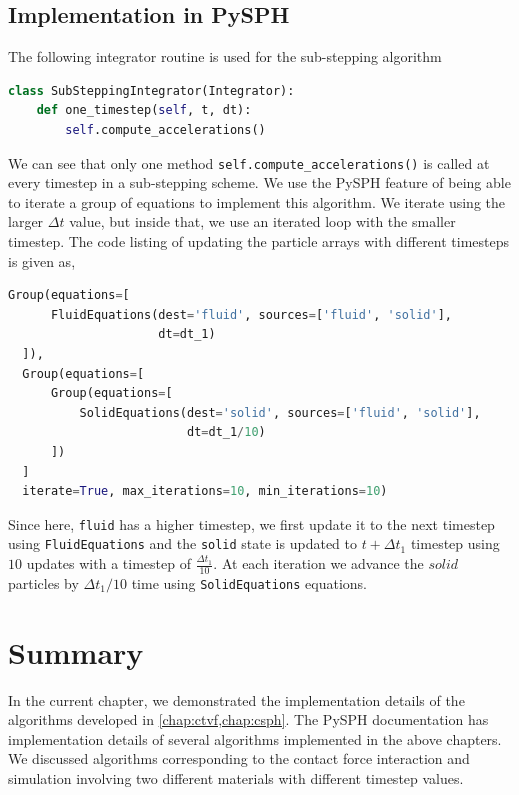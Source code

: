\subsection{Implementation in PySPH}
\label{sec:pysph-substepping-algorithm}
The following integrator routine is used for the sub-stepping algorithm
\lstset{basicstyle=\footnotesize\ttfamily}
\begin{lstlisting}[label={contact:equations},frame=lines,language=Python,upquote=True]
class SubSteppingIntegrator(Integrator):
    def one_timestep(self, t, dt):
        self.compute_accelerations()
\end{lstlisting}
We can see that only one method \texttt{self.compute\_accelerations()} is
called at every timestep in a sub-stepping scheme. We use the PySPH feature of
being able to iterate a group of equations to implement this algorithm. We
iterate using the larger $\Delta t$ value, but inside that, we use an iterated
loop with the smaller timestep. The code listing of updating the particle
arrays with different timesteps is given as,
\lstset{basicstyle=\footnotesize\ttfamily}
\begin{lstlisting}[label={contact:equations},frame=lines,language=Python,upquote=True]
  Group(equations=[
      FluidEquations(dest='fluid', sources=['fluid', 'solid'],
                     dt=dt_1)
  ]),
  Group(equations=[
      Group(equations=[
          SolidEquations(dest='solid', sources=['fluid', 'solid'],
                         dt=dt_1/10)
      ])
  ]
  iterate=True, max_iterations=10, min_iterations=10)
\end{lstlisting}
Since here, \texttt{fluid} has a higher timestep, we first update it to the next
timestep using \texttt{FluidEquations} and the \texttt{solid} state is updated
to $t + \Delta t_1$ timestep using $10$ updates with a timestep of
$\frac{\Delta t_1}{10}$. At each iteration we advance the $solid$ particles by
$\Delta t_1 / 10$ time using \texttt{SolidEquations} equations.


\FloatBarrier%
\section{Summary}
\label{sec:id:summary}
In the current chapter, we demonstrated the implementation details of the
algorithms developed in \cref{chap:ctvf,chap:csph}. The PySPH documentation has
implementation details of several algorithms implemented in the above chapters.
We discussed algorithms corresponding to the contact force interaction and
simulation involving two different materials with different timestep values.

